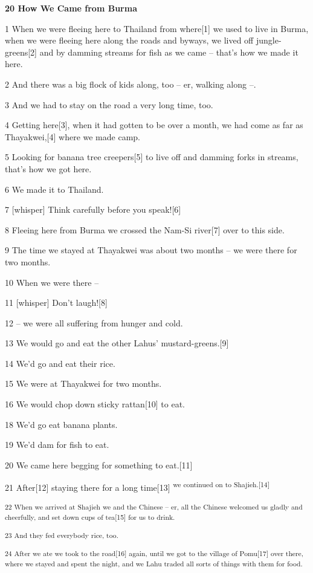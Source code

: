 
{\textbf{20 How We Came from Burma}}

{1 When we were fleeing here to Thailand from where[1] we used to live in
Burma, when we were fleeing here along the roads and byways, we lived off jungle-greens[2]
and by damming streams for fish as we came -- that's how we made it here. }

{2 And there was a big flock of kids along, too -- er, walking along --.
}

{3 And we had to stay on the road a very long time, too. }

{4 Getting here[3], when it had gotten to be over a month, we had come as
far as Thayakwei,[4] where we made camp.}

{5 Looking for banana tree creepers[5] to live off and damming forks in
streams, that's how we got here. }

{6 We made it to Thailand.}

{7 [whisper] Think carefully before you speak![6]}

{8 Fleeing here from Burma we crossed the Nam-Si river[7] over to this side.
}

{9 The time we stayed at Thayakwei was about two months -- we were there
for two months. }

{10 When we were there --}

{11 [whisper] Don't laugh![8]}

{12 -- we were all suffering from hunger and cold. }

{13 We would go and eat the other Lahus' mustard-greens.[9]}

{14 We'd go and eat their rice. }

{15 We were at Thayakwei for two months. }

{16 We would chop down sticky rattan[10] to eat. }

{18 We'd go eat banana plants. }

{19 We'd dam for fish to eat. }

{20 We came here begging for something to eat.[11]}

{21 After[12] staying there for a long time[13]}{\textsuperscript{
we continued on to Shajieh.[14] }}

{\textsuperscript{22 When we arrived at Shajieh we and the Chinese -- er,
all the Chinese welcomed us gladly and cheerfully, and set down cups of tea[15]
for us to drink. }}

{\textsuperscript{23 And they fed everybody rice, too. }}

{\textsuperscript{24 After we ate we took to the road[16] again, until we
got to the village of Pomu[17] over there, where we stayed and spent the night,
and we Lahu traded all sorts of things with them for food.}}

